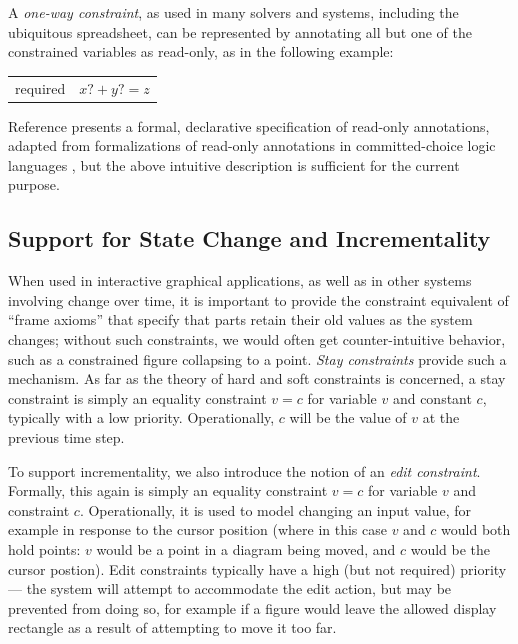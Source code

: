 A \emph{one-way constraint}, as used in many solvers and systems,
including the ubiquitous spreadsheet, can be represented by annotating
all but one of the constrained variables as read-only, as in the
following example:

\begin{center}
\begin{tabular}{rl}
required &     $x?+y?=z$ \\
\end{tabular}
\end{center}

Reference \cite{borning-lisp-symbolic-computation-1992} presents a
formal, declarative specification of read-only annotations, adapted
from formalizations of read-only annotations in committed-choice logic
languages \cite{maher-iclp-1987}, but the above intuitive description
is sufficient for the current purpose.

\subsection{Support for State Change and Incrementality}
\label{sec:state-change}

When used in interactive graphical applications, as well as in other
systems involving change over time, it is important to provide the
constraint equivalent of ``frame axioms'' that specify that parts
retain their old values as the system changes; without such
constraints, we would often get counter-intuitive behavior, such as a
constrained figure collapsing to a point.  \emph{Stay constraints}
provide such a mechanism.  As far as the theory of hard and soft
constraints is concerned, a stay constraint is simply an equality
constraint $v=c$ for variable $v$ and constant $c$, typically with a
low priority.  Operationally, $c$ will be the value of $v$ at the
previous time step.

To support incrementality, we also introduce the notion of an
\emph{edit constraint}.  Formally, this again is simply an equality
constraint $v=c$ for variable $v$ and constraint $c$.  Operationally,
it is used to model changing an input value, for example in
response to the cursor position (where in this case $v$ and $c$ would
both hold points: $v$ would be a point in a diagram being moved, and
$c$ would be the cursor postion).  Edit constraints typically have a
high (but not required) priority --- the system will attempt to
accommodate the edit action, but may be prevented from doing so, for
example if a figure would leave the allowed display rectangle as a
result of attempting to move it too far.

